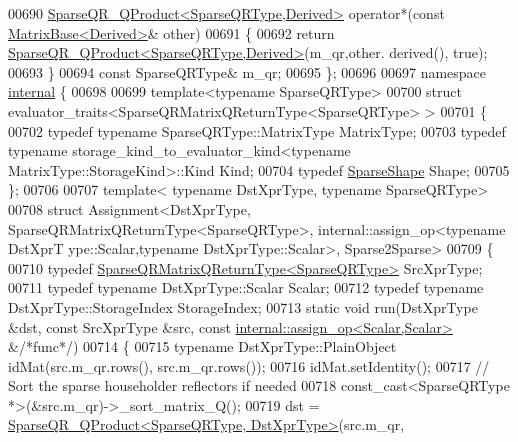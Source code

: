 \begin{DoxyCode}
00690   \hyperlink{struct_eigen_1_1_sparse_q_r___q_product}{SparseQR\_QProduct<SparseQRType,Derived>} operator*(\textcolor{keyword}{const} 
      \hyperlink{group___core___module_class_eigen_1_1_matrix_base}{MatrixBase<Derived>}& other)
00691   \{
00692     \textcolor{keywordflow}{return} \hyperlink{struct_eigen_1_1_sparse_q_r___q_product}{SparseQR\_QProduct<SparseQRType,Derived>}(m\_qr,other.
      derived(), \textcolor{keyword}{true});
00693   \}
00694   \textcolor{keyword}{const} SparseQRType& m\_qr;
00695 \};
00696 
00697 \textcolor{keyword}{namespace }\hyperlink{namespaceinternal}{internal} \{
00698   
00699 \textcolor{keyword}{template}<\textcolor{keyword}{typename} SparseQRType>
00700 \textcolor{keyword}{struct }evaluator\_traits<SparseQRMatrixQReturnType<SparseQRType> >
00701 \{
00702   \textcolor{keyword}{typedef} \textcolor{keyword}{typename} SparseQRType::MatrixType MatrixType;
00703   \textcolor{keyword}{typedef} \textcolor{keyword}{typename} storage\_kind\_to\_evaluator\_kind<typename MatrixType::StorageKind>::Kind Kind;
00704   \textcolor{keyword}{typedef} \hyperlink{struct_eigen_1_1_sparse_shape}{SparseShape} Shape;
00705 \};
00706 
00707 \textcolor{keyword}{template}< \textcolor{keyword}{typename} DstXprType, \textcolor{keyword}{typename} SparseQRType>
00708 \textcolor{keyword}{struct }Assignment<DstXprType, SparseQRMatrixQReturnType<SparseQRType>, internal::assign\_op<typename DstXprT
      ype::Scalar,typename DstXprType::Scalar>, Sparse2Sparse>
00709 \{
00710   \textcolor{keyword}{typedef} \hyperlink{struct_eigen_1_1_sparse_q_r_matrix_q_return_type}{SparseQRMatrixQReturnType<SparseQRType>} SrcXprType;
00711   \textcolor{keyword}{typedef} \textcolor{keyword}{typename} DstXprType::Scalar Scalar;
00712   \textcolor{keyword}{typedef} \textcolor{keyword}{typename} DstXprType::StorageIndex StorageIndex;
00713   \textcolor{keyword}{static} \textcolor{keywordtype}{void} run(DstXprType &dst, \textcolor{keyword}{const} SrcXprType &src, \textcolor{keyword}{const} 
      \hyperlink{struct_eigen_1_1internal_1_1assign__op}{internal::assign\_op<Scalar,Scalar>} &\textcolor{comment}{/*func*/})
00714   \{
00715     \textcolor{keyword}{typename} DstXprType::PlainObject idMat(src.m\_qr.rows(), src.m\_qr.rows());
00716     idMat.setIdentity();
00717     \textcolor{comment}{// Sort the sparse householder reflectors if needed}
00718     \textcolor{keyword}{const\_cast<}SparseQRType *\textcolor{keyword}{>}(&src.m\_qr)->\_sort\_matrix\_Q();
00719     dst = \hyperlink{struct_eigen_1_1_sparse_q_r___q_product}{SparseQR\_QProduct<SparseQRType, DstXprType>}(src.m\_qr, 

\end{DoxyCode}
